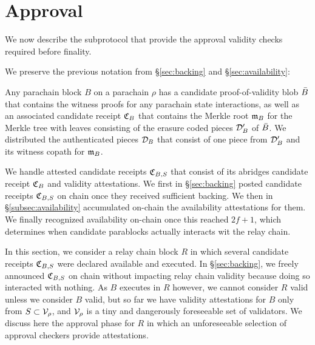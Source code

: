 

\section{Approval} %
\label{sec:approval}

We now describe the subprotocol that provide the approval validity checks required before finality.  


We preserve the previous notation from \S\ref{sec:backing} and \S\ref{sec:availability}:  

Any parachain block $B$ on a parachain $\rho$ has a candidate proof-of-validity blob $\bar{B}$ that contains the witness proofs for any parachain state interactions, as well as an associated candidate receipt $\mathfrak{C}_B$ that contains the Merkle root $\mathfrak{m}_B$ for the Merkle tree with leaves consisting of the erasure coded pieces $\mathcal{D}'_B$ of $\bar{B}$.  We distributed the authenticated pieces $\mathcal{D}_B$ that consist of one piece from $\mathcal{D}'_B$ and its witness copath for $\mathfrak{m}_B$.  

We handle attested candidate receipts $\mathfrak{C}_{B,S}$ that consist of its abridges candidate receipt $\mathfrak{C}_B$ and validity attestations.  We first in \S\ref{sec:backing} posted candidate receipts $\mathfrak{C}_{B,S}$ on chain once they received sufficient backing.  We then in \S\ref{subsec:availability} accumulated on-chain the availability attestations for them.  We finally recognized availability on-chain once this reached $2f+1$, which determines when candidate parablocks actually interacts wit the relay chain. 

In this section, we consider a relay chain block $R$ in which several candidate receipts $\mathfrak{C}_{B,S}$ were declared available and executed.  In \S\ref{sec:backing}, we freely announced $\mathfrak{C}_{B,S}$ on chain without impacting relay chain validity because doing so interacted with nothing.  As $B$ executes in $R$ however, we cannot consider $R$ valid unless we consider $B$ valid, but so far we have validity attestations for $B$ only from $S \subset \mathcal{V}_{\rho}$, and $\mathcal{V}_\rho$ is a tiny and dangerously foreseeable set of validators.  We discuss here the approval phase for $R$ in which an unforeseeable selection of approval checkers provide attestations.


